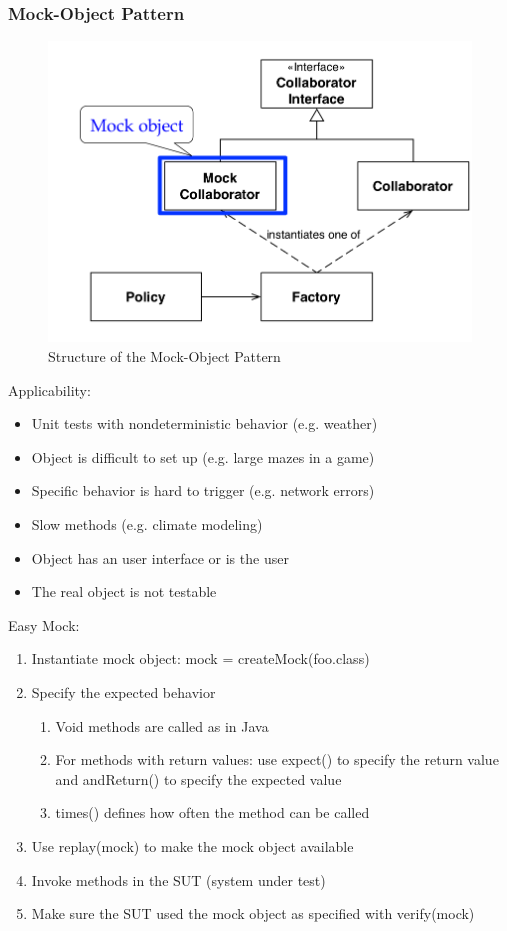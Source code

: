 \subsubsection{Mock-Object Pattern}
\begin{figure}[h]
  \centering
  \includegraphics[width=.75\linewidth]{images/testing_pattern_mock_object.png}
  \caption{Structure of the Mock-Object Pattern}
\end{figure}
Applicability:
\begin{itemize}
  \item Unit tests with nondeterministic behavior (e.g. weather)
  \item Object is difficult to set up (e.g. large mazes in a game)
  \item Specific behavior is hard to trigger (e.g. network errors)
  \item Slow methods (e.g. climate modeling)
  \item Object has an user interface or is the user
  \item The real object is not testable
\end{itemize}
Easy Mock:
\begin{enumerate}
  \item Instantiate mock object: mock = createMock(foo.class)
  \item Specify the expected behavior
  \begin{enumerate}
    \item Void methods are called as in Java
    \item For methods with return values: use expect() to specify the return value and andReturn() to specify the expected value
    \item times() defines how often the method can be called
  \end{enumerate}
  \item Use replay(mock) to make the mock object available
  \item Invoke methods in the SUT (system under test)
  \item Make sure the SUT used the mock object as specified with verify(mock)
\end{enumerate}
\newpage

